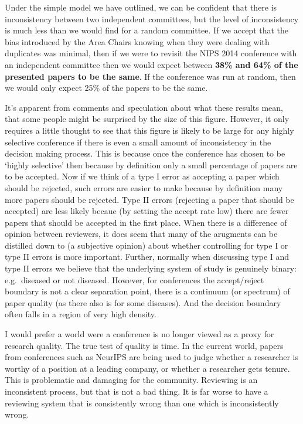 \begin{flushright}
\end{flushright}

Under the simple model we have outlined, we can be confident that there
is inconsistency between two independent committees, but the level of
inconsistency is much less than we would find for a random committee. If
we accept that the bias introduced by the Area Chairs knowing when they
were dealing with duplicates was minimal, then if we were to revisit the
NIPS 2014 conference with an independent committee then we would expect
between \textbf{38\% and 64\% of the presented papers to be the same}.
If the conference was run at random, then we would only expect 25\% of
the papers to be the same.

It's apparent from comments and speculation about what these results
mean, that some people might be surprised by the size of this figure.
However, it only requires a little thought to see that this figure is
likely to be large for any highly selective conference if there is even
a small amount of inconsistency in the decision making process. This is
because once the conference has chosen to be `highly selective' then
because by definition only a small percentage of papers are to be
accepted. Now if we think of a type I error as accepting a paper which
should be rejected, such errors are easier to make because by definition
many more papers should be rejected. Type II errors (rejecting a paper
that should be accepted) are less likely becaue (by setting the accept
rate low) there are fewer papers that should be accepted in the first
place. When there is a difference of opinion between reviewers, it does
seem that many of the arugments can be distilled down to (a subjective
opinion) about whether controlling for type I or type II errors is more
important. Further, normally when discussing type I and type II errors
we believe that the underlying system of study is genuinely binary:
e.g.~diseased or not diseased. However, for conferences the
accept/reject boundary is not a clear separation point, there is a
continuum (or spectrum) of paper quality (as there also is for some
diseases). And the decision boundary often falls in a region of very
high density.

I would prefer a world were a conference is no longer viewed as a proxy
for research quality. The true test of quality is time. In the current
world, papers from conferences such as NeurIPS are being used to judge
whether a researcher is worthy of a position at a leading company, or
whether a researcher gets tenure. This is problematic and damaging for
the community. Reviewing is an inconsistent process, but that is not a
bad thing. It is far worse to have a reviewing system that is
consistently wrong than one which is inconsistently wrong.

